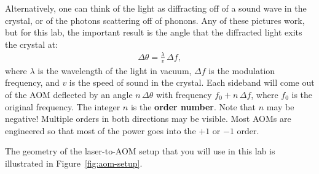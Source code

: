 \documentclass[]{manual}
\begin{document}
    Alternatively, one can think of the light as diffracting off of a sound wave in the crystal, or of the photons scattering off of phonons.
    Any of these pictures work, but for this lab, the important result is the angle that the diffracted light exits the crystal at:
    \begin{align} \label{eqn:output-angle}
        \Delta \theta = \frac{\lambda}{v} \, \Delta f,
    \end{align}
    where $\lambda$ is the wavelength of the light in vacuum, $\Delta f$ is the modulation frequency, and $v$ is the speed of sound in the crystal.
    Each sideband will come out of the AOM deflected by an angle $n \, \Delta \theta$ with frequency $f_0 + n \, \Delta f$, where $f_0$ is the original frequency.
    The integer $n$ is the \textbf{order number}.
    Note that $n$ may be negative!
    Multiple orders in both directions may be visible.
    Most AOMs are engineered so that most of the power goes into the $+1$ or $-1$ order.

    The geometry of the laser-to-AOM setup that you will use in this lab is illustrated in Figure~\ref{fig:aom-setup}.
\end{document}
